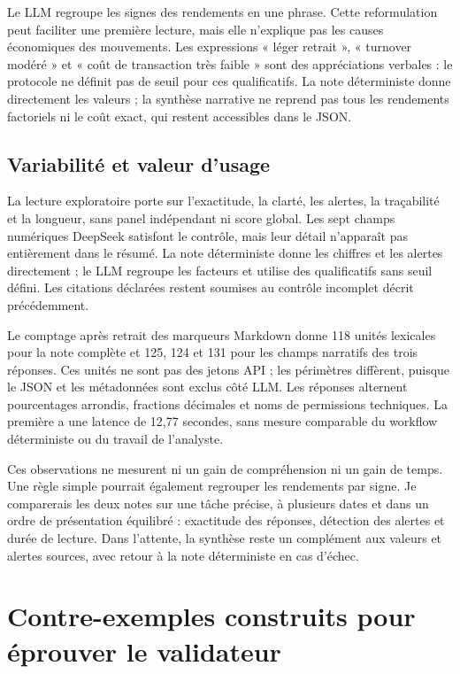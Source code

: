 Le LLM regroupe les signes des rendements en une phrase. Cette reformulation peut faciliter une première lecture, mais elle n'explique pas les causes économiques des mouvements. Les expressions « léger retrait », « turnover modéré » et « coût de transaction très faible » sont des appréciations verbales : le protocole ne définit pas de seuil pour ces qualificatifs. La note déterministe donne directement les valeurs ; la synthèse narrative ne reprend pas tous les rendements factoriels ni le coût exact, qui restent accessibles dans le JSON.

\subsection{Variabilité et valeur d'usage}

La lecture exploratoire porte sur l'exactitude, la clarté, les alertes, la traçabilité et la longueur, sans panel indépendant ni score global. Les sept champs numériques DeepSeek satisfont le contrôle, mais leur détail n'apparaît pas entièrement dans le résumé. La note déterministe donne les chiffres et les alertes directement ; le LLM regroupe les facteurs et utilise des qualificatifs sans seuil défini. Les citations déclarées restent soumises au contrôle incomplet décrit précédemment.

Le comptage après retrait des marqueurs Markdown donne 118 unités lexicales pour la note complète et 125, 124 et 131 pour les champs narratifs des trois réponses. Ces unités ne sont pas des jetons API ; les périmètres diffèrent, puisque le JSON et les métadonnées sont exclus côté LLM. Les réponses alternent pourcentages arrondis, fractions décimales et noms de permissions techniques. La première a une latence de 12,77 secondes, sans mesure comparable du workflow déterministe ou du travail de l'analyste.

Ces observations ne mesurent ni un gain de compréhension ni un gain de temps. Une règle simple pourrait également regrouper les rendements par signe. Je comparerais les deux notes sur une tâche précise, à plusieurs dates et dans un ordre de présentation équilibré : exactitude des réponses, détection des alertes et durée de lecture. Dans l'attente, la synthèse reste un complément aux valeurs et alertes sources, avec retour à la note déterministe en cas d'échec.

\section{Contre-exemples construits pour éprouver le validateur}
\label{sec:contre-exemples}

